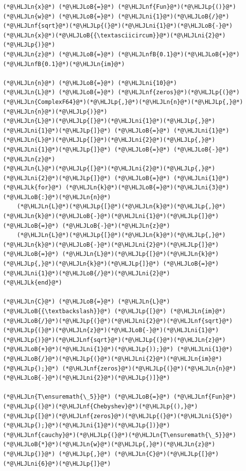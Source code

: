 \documentclass[12pt,a4paper]{article}
\newcommand{\HLJLk}[1]{\textcolor[RGB]{148,91,176}{\textbf{#1}}}
\newcommand{\HLJLn}[1]{#1}
\newcommand{\HLJLnf}[1]{\textcolor[RGB]{66,102,213}{#1}}
\newcommand{\HLJLnfB}[1]{\textcolor[RGB]{59,151,46}{#1}}
\newcommand{\HLJLni}[1]{\textcolor[RGB]{59,151,46}{#1}}
\newcommand{\HLJLoB}[1]{\textcolor[RGB]{102,102,102}{\textbf{#1}}}
\newcommand{\HLJLp}[1]{#1}
\begin{document}
\begin{lstlisting}
(*@\HLJLn{x}@*) (*@\HLJLoB{=}@*) (*@\HLJLnf{Fun}@*)(*@\HLJLp{()}@*)
(*@\HLJLn{w}@*) (*@\HLJLoB{=}@*) (*@\HLJLni{1}@*)(*@\HLJLoB{/}@*)(*@\HLJLnf{sqrt}@*)(*@\HLJLp{(}@*)(*@\HLJLni{1}@*)(*@\HLJLoB{-}@*)(*@\HLJLn{x}@*)(*@\HLJLoB{{\textasciicircum}}@*)(*@\HLJLni{2}@*)(*@\HLJLp{)}@*)
(*@\HLJLn{z}@*) (*@\HLJLoB{=}@*) (*@\HLJLnfB{0.1}@*)(*@\HLJLoB{+}@*)(*@\HLJLnfB{0.1}@*)(*@\HLJLn{im}@*)

(*@\HLJLn{n}@*) (*@\HLJLoB{=}@*) (*@\HLJLni{10}@*)
(*@\HLJLn{L}@*) (*@\HLJLoB{=}@*) (*@\HLJLnf{zeros}@*)(*@\HLJLp{(}@*)(*@\HLJLn{ComplexF64}@*)(*@\HLJLp{,}@*)(*@\HLJLn{n}@*)(*@\HLJLp{,}@*)(*@\HLJLn{n}@*)(*@\HLJLp{)}@*)
(*@\HLJLn{L}@*)(*@\HLJLp{[}@*)(*@\HLJLni{1}@*)(*@\HLJLp{,}@*)(*@\HLJLni{1}@*)(*@\HLJLp{]}@*) (*@\HLJLoB{=}@*) (*@\HLJLni{1}@*)
(*@\HLJLn{L}@*)(*@\HLJLp{[}@*)(*@\HLJLni{2}@*)(*@\HLJLp{,}@*)(*@\HLJLni{1}@*)(*@\HLJLp{]}@*) (*@\HLJLoB{=}@*) (*@\HLJLoB{-}@*)(*@\HLJLn{z}@*)
(*@\HLJLn{L}@*)(*@\HLJLp{[}@*)(*@\HLJLni{2}@*)(*@\HLJLp{,}@*)(*@\HLJLni{2}@*)(*@\HLJLp{]}@*) (*@\HLJLoB{=}@*) (*@\HLJLni{1}@*)
(*@\HLJLk{for}@*) (*@\HLJLn{k}@*)(*@\HLJLoB{=}@*)(*@\HLJLni{3}@*)(*@\HLJLoB{:}@*)(*@\HLJLn{n}@*)
    (*@\HLJLn{L}@*)(*@\HLJLp{[}@*)(*@\HLJLn{k}@*)(*@\HLJLp{,}@*)(*@\HLJLn{k}@*)(*@\HLJLoB{-}@*)(*@\HLJLni{1}@*)(*@\HLJLp{]}@*) (*@\HLJLoB{=}@*) (*@\HLJLoB{-}@*)(*@\HLJLn{z}@*)
    (*@\HLJLn{L}@*)(*@\HLJLp{[}@*)(*@\HLJLn{k}@*)(*@\HLJLp{,}@*)(*@\HLJLn{k}@*)(*@\HLJLoB{-}@*)(*@\HLJLni{2}@*)(*@\HLJLp{]}@*) (*@\HLJLoB{=}@*) (*@\HLJLn{L}@*)(*@\HLJLp{[}@*)(*@\HLJLn{k}@*)(*@\HLJLp{,}@*)(*@\HLJLn{k}@*)(*@\HLJLp{]}@*) (*@\HLJLoB{=}@*) (*@\HLJLni{1}@*)(*@\HLJLoB{/}@*)(*@\HLJLni{2}@*)
(*@\HLJLk{end}@*)

(*@\HLJLn{C}@*) (*@\HLJLoB{=}@*) (*@\HLJLn{L}@*) (*@\HLJLoB{{\textbackslash}}@*) (*@\HLJLp{[}@*) (*@\HLJLn{im}@*)(*@\HLJLoB{/}@*)(*@\HLJLp{(}@*)(*@\HLJLni{2}@*)(*@\HLJLnf{sqrt}@*)(*@\HLJLp{(}@*)(*@\HLJLn{z}@*)(*@\HLJLoB{-}@*)(*@\HLJLni{1}@*)(*@\HLJLp{)}@*)(*@\HLJLnf{sqrt}@*)(*@\HLJLp{(}@*)(*@\HLJLn{z}@*)(*@\HLJLoB{+}@*)(*@\HLJLni{1}@*)(*@\HLJLp{));}@*) (*@\HLJLni{1}@*)(*@\HLJLoB{/}@*)(*@\HLJLp{(}@*)(*@\HLJLni{2}@*)(*@\HLJLn{im}@*)(*@\HLJLp{);}@*) (*@\HLJLnf{zeros}@*)(*@\HLJLp{(}@*)(*@\HLJLn{n}@*)(*@\HLJLoB{-}@*)(*@\HLJLni{2}@*)(*@\HLJLp{)]}@*)

(*@\HLJLn{T\ensuremath{\_5}}@*) (*@\HLJLoB{=}@*) (*@\HLJLnf{Fun}@*)(*@\HLJLp{(}@*)(*@\HLJLnf{Chebyshev}@*)(*@\HLJLp{(),}@*) (*@\HLJLp{[}@*)(*@\HLJLnf{zeros}@*)(*@\HLJLp{(}@*)(*@\HLJLni{5}@*)(*@\HLJLp{);}@*)(*@\HLJLni{1}@*)(*@\HLJLp{])}@*)
(*@\HLJLnf{cauchy}@*)(*@\HLJLp{(}@*)(*@\HLJLn{T\ensuremath{\_5}}@*)(*@\HLJLoB{*}@*)(*@\HLJLn{w}@*)(*@\HLJLp{,}@*)(*@\HLJLn{z}@*)(*@\HLJLp{)}@*) (*@\HLJLp{,}@*) (*@\HLJLn{C}@*)(*@\HLJLp{[}@*)(*@\HLJLni{6}@*)(*@\HLJLp{]}@*)
\end{lstlisting}
\end{document}
